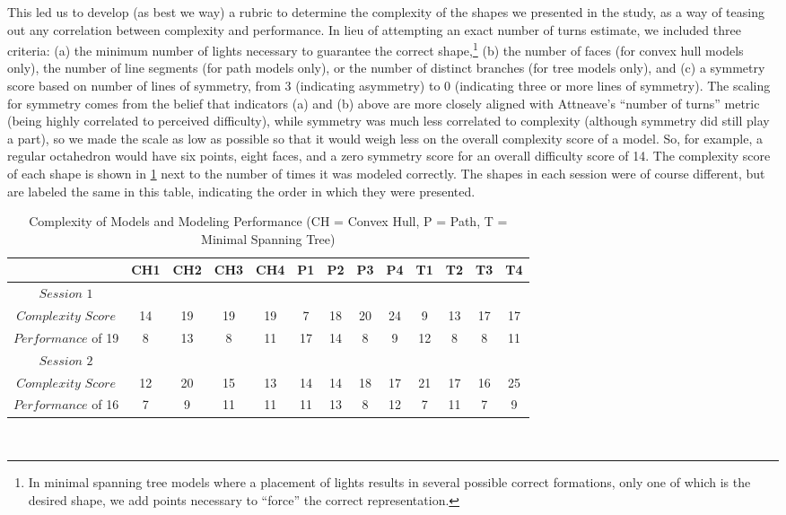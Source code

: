 This led us to develop (as best we way) a rubric to determine the complexity of
the shapes we presented in the study, as a way of teasing out any correlation
between complexity and performance. In lieu of attempting an exact number of
turns estimate, we included three criteria: (a) the minimum number of lights
necessary to guarantee the correct shape,\footnote{In minimal spanning tree
models where a placement of lights results in several possible correct
formations, only one of which is the desired shape, we add points necessary to
``force'' the correct representation.} (b) the number of faces (for convex hull
models only), the number of line segments (for path models only), or the number
of distinct branches (for tree models only), and (c) a symmetry score based on
number of lines of symmetry, from 3 (indicating asymmetry) to 0 (indicating
three or more lines of symmetry). The scaling for symmetry comes from the belief
that indicators (a) and (b) above are more closely aligned with Attneave's
``number of turns'' metric (being highly correlated to perceived difficulty),
while symmetry was much less correlated to complexity (although symmetry did
still play a part), so we made the scale as low as possible so that it would
weigh less on the overall complexity score of a model. So, for example, a
regular octahedron would have six points, eight faces, and a zero symmetry score
for an overall difficulty score of 14. The complexity score of each shape is
shown in \ref{modelComplexity} next to the number of times it was modeled
correctly. The shapes in each session were of course different, but are labeled
the same in this table, indicating the order in which they were presented.

\begin{table}[!ht] 
\small
    \caption[Complexity of Models and Modeling Performance]{Complexity of Models
    and Modeling Performance (CH = Convex Hull, P = Path, T = Minimal Spanning
    Tree)}
    \begin{center}
    \begin{tabular}{| c | c | c | c | c | c | c | c | c | c | c | c | c | }
    \hline $ $ & CH1 & CH2 & CH3 & CH4 & P1 & P2 & P3 & P4 & T1 & T2 & T3 & T4 \\
   	\hline
   	$Session$ $1$ & & & & & & & & & & & &  \\ \hline
   	$Complexity$ $Score$ & 14 & 19 & 19 & 19 & 7 & 18 & 20 & 24 & 9 & 13 & 17 &
   	17 \\ \hline 
   	$Performance$ of 19 & 8 & 13 & 8 & 11 & 17 & 14 & 8 & 9 & 12 & 8 & 8 & 11 \\
   	\hline 
   	$Session$ $2$ & & & & & & & & & & & & \\ \hline
   	$Complexity$ $Score$ & 12 & 20 & 15 & 13 & 14 & 14 & 18 & 17 & 21 & 17 & 16
   	& 25 \\ \hline 
   	$Performance$ of 16 & 7 & 9 & 11 & 11 & 11 & 13 & 8 & 12 & 7 & 11 & 7 & 9 \\
   	\hline
   	
	\end{tabular}
   \\ \rule{0mm}{5mm}
\end{center}
\label{modelComplexity}
\end{table}


